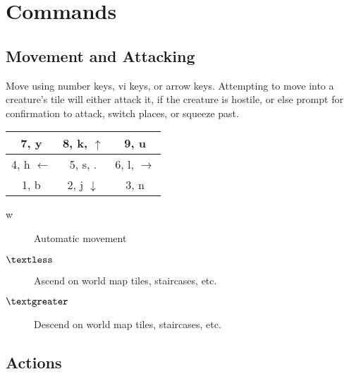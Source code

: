 \section{Commands}

\subsection{Movement and Attacking}

Move using number keys, vi keys, or arrow keys.  Attempting to move into a
creature's tile will either attack it, if the creature is hostile, or
else prompt for confirmation to attack, switch places, or squeeze past.

\begin{center}
\begin{tabular}{|c|c|c|}
\hline
7, y & 8, k, $\uparrow$ & 9, u \\
\hline
4, h $\leftarrow$ & 5, s, . & 6, l, $\rightarrow$ \\
\hline
1, b & 2, j $\downarrow$ & 3, n \\
\hline
\end{tabular}
\end{center}

\begin{description}
\item[w]
Automatic movement
\item[$\textless$] 
Ascend on world map tiles, staircases, etc.
\item[$\textgreater$] 
Descend on world map tiles, staircases, etc.
\end{description}

\subsection{Actions}

